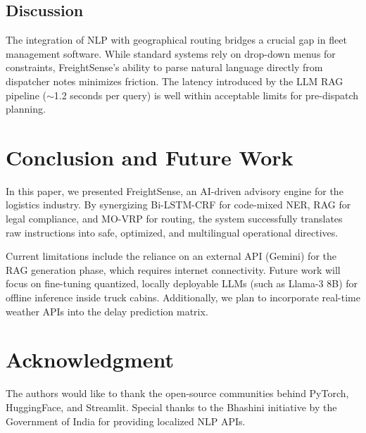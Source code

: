 \documentclass[conference]{IEEEtran}
\begin{document}
\subsection{Discussion}
The integration of NLP with geographical routing bridges a crucial gap in fleet management software. While standard systems rely on drop-down menus for constraints, FreightSense's ability to parse natural language directly from dispatcher notes minimizes friction. The latency introduced by the LLM RAG pipeline ($\sim$1.2 seconds per query) is well within acceptable limits for pre-dispatch planning.

\section{Conclusion and Future Work}
In this paper, we presented FreightSense, an AI-driven advisory engine for the logistics industry. By synergizing Bi-LSTM-CRF for code-mixed NER, RAG for legal compliance, and MO-VRP for routing, the system successfully translates raw instructions into safe, optimized, and multilingual operational directives.

Current limitations include the reliance on an external API (Gemini) for the RAG generation phase, which requires internet connectivity. Future work will focus on fine-tuning quantized, locally deployable LLMs (such as Llama-3 8B) for offline inference inside truck cabins. Additionally, we plan to incorporate real-time weather APIs into the delay prediction matrix.

\section*{Acknowledgment}
The authors would like to thank the open-source communities behind PyTorch, HuggingFace, and Streamlit. Special thanks to the Bhashini initiative by the Government of India for providing localized NLP APIs.
\end{document}
